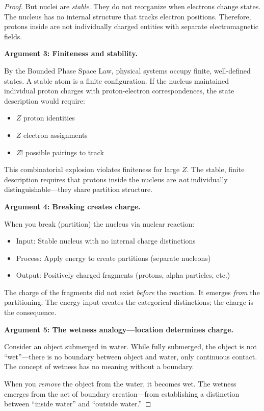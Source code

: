 \documentclass[twocolumn,10pt,a4paper]{article}
\theoremstyle{definition}
\theoremstyle{remark}
\begin{document}
\begin{proof}
But nuclei are \emph{stable}. They do not reorganize when electrons change states. The nucleus has no internal structure that tracks electron positions. Therefore, protons inside are not individually charged entities with separate electromagnetic fields.

\textbf{Argument 3: Finiteness and stability.}

By the Bounded Phase Space Law, physical systems occupy finite, well-defined states. A stable atom is a finite configuration. If the nucleus maintained individual proton charges with proton-electron correspondences, the state description would require:
\begin{itemize}
    \item $Z$ proton identities
    \item $Z$ electron assignments
    \item $Z!$ possible pairings to track
\end{itemize}

This combinatorial explosion violates finiteness for large $Z$. The stable, finite description requires that protons inside the nucleus are \emph{not} individually distinguishable---they share partition structure.

\textbf{Argument 4: Breaking creates charge.}

When you break (partition) the nucleus via nuclear reaction:
\begin{itemize}
    \item Input: Stable nucleus with no internal charge distinctions
    \item Process: Apply energy to create partitions (separate nucleons)
    \item Output: Positively charged fragments (protons, alpha particles, etc.)
\end{itemize}

The charge of the fragments did not exist \emph{before} the reaction. It emerges \emph{from} the partitioning. The energy input creates the categorical distinctions; the charge is the consequence.

\textbf{Argument 5: The wetness analogy---location determines charge.}

Consider an object submerged in water. While fully submerged, the object is not ``wet''---there is no boundary between object and water, only continuous contact. The concept of wetness has no meaning without a boundary.

When you \emph{remove} the object from the water, it becomes wet. The wetness emerges from the act of boundary creation---from establishing a distinction between ``inside water'' and ``outside water.''


\end{proof}
\end{document}
